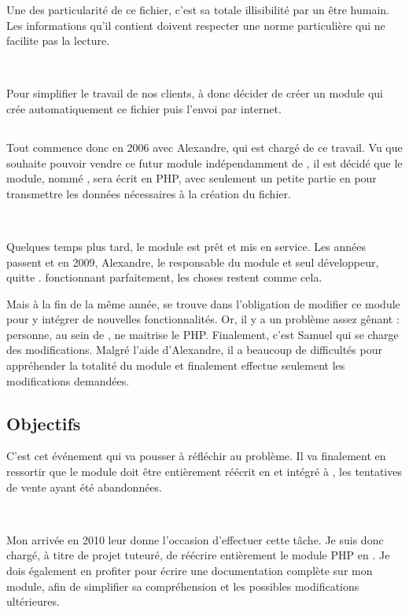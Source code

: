 Une des particularité de ce fichier, c'est sa totale illisibilité par un être humain. Les informations qu'il contient doivent respecter une norme particulière qui ne facilite pas la lecture.

~

Pour simplifier le travail de nos clients, \solulog{} à donc décider de créer un module qui crée automatiquement ce fichier puis l'envoi par internet.

\subsection{\pireus}
Tout commence donc en 2006 avec Alexandre, qui est chargé de ce travail. Vu que \solulog{} souhaite pouvoir vendre ce futur module indépendamment de \integrale, il est décidé que le module, nommé \emph{\pireus}, sera écrit en PHP, avec seulement un petite partie en \vb{} pour transmettre les données nécessaires à la création du fichier.

~

Quelques temps plus tard, le module est prêt et mis en service. Les années passent et en 2009, Alexandre, le responsable du module et seul développeur, quitte \solulog. \pireus fonctionnant parfaitement, les choses restent comme cela.

Mais à la fin de la même année, \solulog{} se trouve dans l'obligation de modifier ce module pour y intégrer de nouvelles fonctionnalités. Or, il y a un problème assez gênant : personne, au sein de \solulog, ne maitrise le PHP. Finalement, c'est Samuel qui se charge des modifications. Malgré l'aide d'Alexandre, il a beaucoup de difficultés pour appréhender la totalité du module et finalement effectue seulement les modifications demandées.

\vfill

\subsection{Objectifs}
C'est cet événement qui va pousser \solulog{} à réfléchir au problème. Il va finalement en ressortir que le module doit être entièrement réécrit en \vb{} et intégré à \integrale, les tentatives de vente ayant été abandonnées.

~

Mon arrivée en 2010 leur donne l'occasion d'effectuer cette tâche. Je suis donc chargé, à titre de projet tuteuré, de réécrire entièrement le module PHP en \vb. Je dois également en profiter pour écrire une documentation complète sur mon module, afin de simplifier sa compréhension et les possibles modifications ultérieures.

